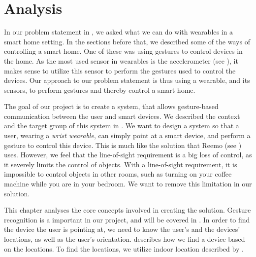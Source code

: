 \chapter{Analysis}\label{chap:analysis}

In our problem statement in , 
we asked what we can do with wearables in a smart home setting.
In the sections before that, 
we described some of the ways of controlling a smart home. 
One of these was using gestures to control devices in the home. 
As the most used sensor in wearables is the accelerometer (see ), 
it makes sense to utilize this sensor to perform the gestures used to control the devices. 
Our approach to our problem statement is thus using a wearable, 
and its sensors, to perform gestures and thereby control a smart home. 

The goal of our project is to create a system, 
that allows gesture-based communication between the user and smart devices.
We described the context and the target group of this system in .
We want to design a system so that a user, wearing a \emph{wrist wearable}, 
can simply point at a smart device, 
and perform a gesture to control this device. 
This is much like the solution that Reemo (see ) uses. 
However, we feel that the line-of-sight requirement is a big loss of control, 
as it severely limits the control of objects.
With a line-of-sight requirement, 
it is impossible to control objects in other rooms, 
such as turning on your coffee machine while you are in your bedroom. 
We want to remove this limitation in our solution. 

This chapter analyses the core concepts involved in creating the solution.
Gesture recognition is a important in our project, 
and will be covered in . 
In order to find the device the user is pointing at,
we need to know the user's and the devices' locations, 
as well as the user's orientation. 
 describes how we find a device based on the locations. 
To find the locations, we utilize indoor location described by .




